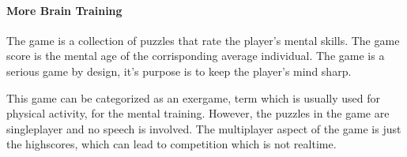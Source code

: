 \documentclass[12pt]{article}
\begin{document}
\vfill
{}

\clearpage

\paragraph{More Brain Training} \cite{mbt}
The game is a collection of puzzles that rate the player's mental skills. The game score is the mental age of the corrisponding average individual. The game is a serious game by design, it's purpose is to keep the player's mind sharp.

\vspace{0.4cm}
\vspace{0.4cm}

This game can be categorized as an exergame, term which is usually used for physical activity, for the mental training. However, the puzzles in the game are singleplayer and no speech is involved. The multiplayer aspect of the game is just the highscores, which can lead to competition which is not realtime.
\end{document}
